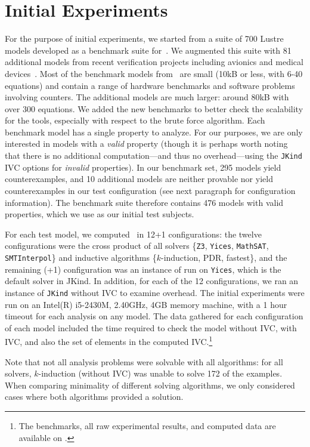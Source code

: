 \section{Initial Experiments}
\label{sec:exprinit}
For the purpose of initial experiments, we started from a suite of 700 Lustre models developed
as a benchmark suite for~\cite{Hagen08:FMCAD}. We augmented this suite
with 81 additional models from recent verification projects including
avionics and medical devices~\cite{QFCS15:backes,hilt2013}. Most of
the benchmark models from~\cite{Hagen08:FMCAD} are small (10kB or less,
with 6-40 equations) and contain a range of hardware benchmarks and
software problems involving counters. The additional models are much
larger: around 80kB with over 300 equations. We added the new
benchmarks to better check the scalability for the tools, especially
with respect to the brute force algorithm.
%
Each benchmark model has a single property to analyze.  For our purposes, we are only interested in models with a {\em valid} property (though it is perhaps worth noting that there is no additional computation---and thus no overhead---using the \texttt{JKind} IVC options for {\em invalid} properties).  In our benchmark set, 295 models yield counterexamples, and 10 additional models are neither provable nor yield counterexamples in our test configuration (see next paragraph for configuration information).  The benchmark suite therefore contains 476 models with valid properties, which we use as our initial test subjects.

For each test model, we computed \ucalg\ in 12+1 configurations: the
twelve configurations were the cross product of all solvers \{\texttt{Z3},
\texttt{Yices}, \texttt{MathSAT}, \texttt{SMTInterpol}\} and inductive algorithms
\{$k$-induction, PDR, fastest\}, and the remaining (+1) configuration
was an instance of \bfalg run on \texttt{Yices}, which is the default solver in
JKind.
 In addition, for each of the 12 configurations, we ran an
instance of \texttt{JKind} without IVC to examine overhead. The initial experiments
were run on an Intel(R) i5-2430M, 2.40GHz, 4GB memory machine, with a
1 hour timeout for each analysis on any model. The data gathered for
each configuration of each model included the time required to check
the model without IVC, with IVC, and also the set of elements in the
computed IVC.\footnote{The benchmarks, all raw experimental results,
  and computed data are available on \cite{expr}.}

Note that not all analysis problems were solvable with all algorithms: for all solvers, $k$-induction (without IVC) was unable to solve 172 of the examples.  When comparing minimality of different solving algorithms, we only considered cases where both algorithms provided a solution.

